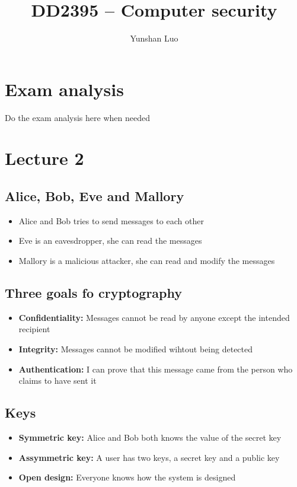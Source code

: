 \documentclass[12pt,a4paper]{article}
\begin{document}
\author{Yunshan Luo}
\title{DD2395 -- Computer security}
\maketitle
\newpage
\section{Exam analysis}
Do the exam analysis here when needed 

\section{Lecture 2}
\subsection{Alice, Bob, Eve and Mallory}
\begin{itemize}
    \item Alice and Bob tries to send messages to each other
    \item Eve is an eavesdropper, she can read the messages
    \item Mallory is a malicious attacker, she can read and modify the messages
\end{itemize}

\subsection{Three goals fo cryptography}
\begin{itemize}
    \item \textbf{Confidentiality:} Messages cannot be read by anyone except the intended recipient
    \item \textbf{Integrity:} Messages cannot be modified wihtout being detected
    \item \textbf{Authentication:} I can prove that this message came from the person who claims to have sent it
\end{itemize}

\subsection{Keys}
\begin{itemize}
    \item \textbf{Symmetric key:} Alice and Bob both knows the value of the secret key
    \item \textbf{Assymmetric key:} A user has two keys, a secret key and a public key
    \item \textbf{Open design:} Everyone knows how the system is designed
\end{itemize}
\end{document}
